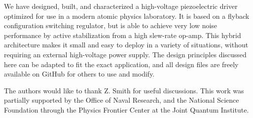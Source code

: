 \documentclass[aip,rsi,reprint]{revtex4-1} %
\begin{document}
We have designed, built, and characterized a high-voltage piezoelectric driver optimized for use in a modern atomic physics laboratory.
It is based on a flyback configuration switching regulator, but is able to achieve very low noise performance by active stabilization from a high slew-rate op-amp.
This hybrid architecture makes it small and easy to deploy in a variety of situations, without requiring an external high-voltage power supply.
The design principles discussed here can be adapted to fit the exact application, and all design files are freely available on GitHub for others to use and modify.

The authors would like to thank Z. Smith for useful discussions.
This work was partially supported by the Office of Naval Research, and the National Science Foundation through the Physics Frontier Center at the Joint Quantum Institute.
 
%
\end{document}
